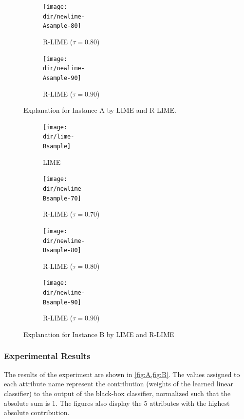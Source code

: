 \documentclass[runningheads]{llncs}
\begin{document}
{{\begin{figure}[p]
\begin{subfigure}[t]{\imgwidth}
					\texttt{[image: \\dir/newlime-\\Asample-80]}
					\caption{R-LIME ($\tau=0.80$)}\label{fig:A-rlime-80}
				\end{subfigure}
				\begin{subfigure}[t]{\imgwidth}
					\texttt{[image: \\dir/newlime-\\Asample-90]}
					\caption{R-LIME ($\tau=0.90$)}\label{fig:A-rlime-90}
				\end{subfigure}
				\caption{Explanation for Instance A by LIME and R-LIME.}\label{fig:A}
			\end{figure}
			\begin{figure}[p]
				\centering
				\begin{subfigure}[t]{\imgwidth}
					\texttt{[image: \\dir/lime-\\Bsample]}
					\caption{LIME}\label{fig:B-lime}
				\end{subfigure}
				\begin{subfigure}[t]{\imgwidth}
					\texttt{[image: \\dir/newlime-\\Bsample-70]}
					\caption{R-LIME ($\tau=0.70$)}\label{fig:B-rlime-70}
				\end{subfigure}
				\begin{subfigure}[t]{\imgwidth}
					\texttt{[image: \\dir/newlime-\\Bsample-80]}
					\caption{R-LIME ($\tau=0.80$)}\label{fig:B-rlime-80}
				\end{subfigure}
				\begin{subfigure}[t]{\imgwidth}
					\hspace{0em}
					\texttt{[image: \\dir/newlime-\\Bsample-90]}
					\caption{R-LIME ($\tau=0.90$)}\label{fig:B-rlime-90}
				\end{subfigure}
				\caption{Explanation for Instance B by LIME and R-LIME}\label{fig:B}
			\end{figure}
		}
	}
\subsubsection{Experimental Results}
The results of the experiment are shown in \cref{fig:A,fig:B}.
The values assigned to each attribute name represent the contribution
(weights of the learned linear classifier)
to the output of the black-box classifier,
normalized such that the absolute sum is 1.
The figures also display the 5 attributes with the highest absolute contribution.
\end{document}
